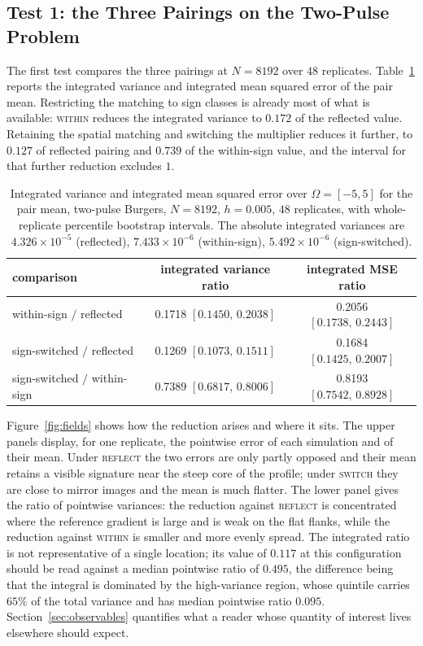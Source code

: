 \documentclass[smallextended,nospthms]{svjour3}
\theoremstyle{plain}
\theoremstyle{definition}
\theoremstyle{remark}
\numberwithin{equation}{section}
\newcommand{\refl}{\textnormal{\textsc{reflect}}}
\newcommand{\swi}{\textnormal{\textsc{switch}}}
\newcommand{\wit}{\textnormal{\textsc{within}}}
\begin{document}
\subsection{Test 1: the Three Pairings on the Two-Pulse Problem}
\label{sec:test1}

The first test compares the three pairings at $N=8192$ over $48$ replicates.
Table~\ref{tab:headline} reports the integrated variance and integrated mean
squared error of the pair mean. Restricting the matching to sign classes is
already most of what is available: \wit{} reduces the integrated variance to
$0.172$ of the reflected value. Retaining the spatial matching and switching
the multiplier reduces it further, to $0.127$ of reflected pairing and $0.739$
of the within-sign value, and the interval for that further reduction excludes
$1$.

\begin{table}[htbp]
\centering
\caption{Integrated variance and integrated mean squared error over
$\Omega=[-5,5]$ for the pair mean, two-pulse Burgers, $N=8192$, $h=0.005$,
$48$ replicates, with whole-replicate percentile bootstrap intervals. The
absolute integrated variances are $4.326\times10^{-5}$ (reflected),
$7.433\times10^{-6}$ (within-sign), $5.492\times10^{-6}$ (sign-switched).}
\label{tab:headline}
\begin{tabular}{lcc}
\toprule
comparison & integrated variance ratio & integrated MSE ratio\\
\midrule
within-sign $/$ reflected      & 0.1718 $[0.1450,\,0.2038]$ & 0.2056 $[0.1738,\,0.2443]$\\
sign-switched $/$ reflected    & 0.1269 $[0.1073,\,0.1511]$ & 0.1684 $[0.1425,\,0.2007]$\\
sign-switched $/$ within-sign & 0.7389 $[0.6817,\,0.8006]$ & 0.8193 $[0.7542,\,0.8928]$\\
\bottomrule
\end{tabular}
\end{table}

Figure~\ref{fig:fields} shows how the reduction arises and where it sits. The
upper panels display, for one replicate, the pointwise error of each simulation
and of their mean. Under \refl{} the two errors are only partly opposed and
their mean retains a visible signature near the steep core of the profile;
under \swi{} they are close to mirror images and the mean is much flatter. The
lower panel gives the ratio of pointwise variances: the reduction against
\refl{} is concentrated where the reference gradient is large and is weak on
the flat flanks, while the reduction against \wit{} is smaller and more evenly
spread. The integrated ratio is not representative of a single location; its
value of $0.117$ at this configuration should be read against a median
pointwise ratio of $0.495$, the difference being that the integral is dominated
by the high-variance region, whose quintile carries $65\%$ of the total
variance and has median pointwise ratio $0.095$. Section~\ref{sec:observables}
quantifies what a reader whose quantity of interest lives elsewhere should
expect.
\end{document}
